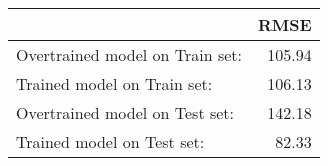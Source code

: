 \begin{tabular}{lr}
\toprule
{} & RMSE\\
\midrule
Overtrained model on Train set: & 105.94 \\
Trained model on Train set: & 106.13 \\
Overtrained model on Test set: & 142.18  \\
Trained model on Test set:  & 82.33 \\

\bottomrule
\end{tabular}


